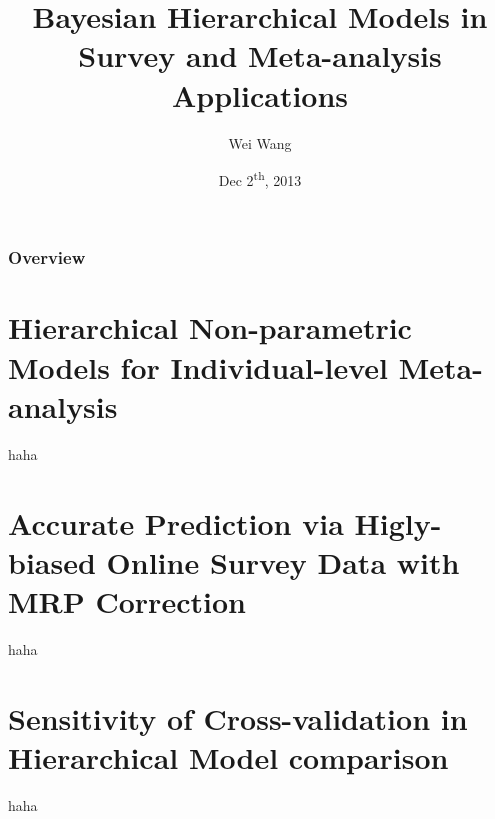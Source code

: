 \documentclass[xetex,mathserif,serif]{beamer}
\title{Bayesian Hierarchical Models in Survey and Meta-analysis Applications}
\author{Wei Wang}
\date{Dec 2\textsuperscript{th}, 2013}
\begin{document}
\frame{\titlepage}

%
%

\begin{frame}
\frametitle{Overview}
        \tableofcontents
\end{frame}

\section{Hierarchical Non-parametric Models for Individual-level Meta-analysis}
\begin{frame}
  haha
\end{frame}

\section{Accurate Prediction via Higly-biased Online Survey Data with MRP
  Correction}
\begin{frame}
  haha
\end{frame}


\section{Sensitivity of Cross-validation in Hierarchical Model comparison}
\begin{frame}
  haha
\end{frame}
\end{document}
